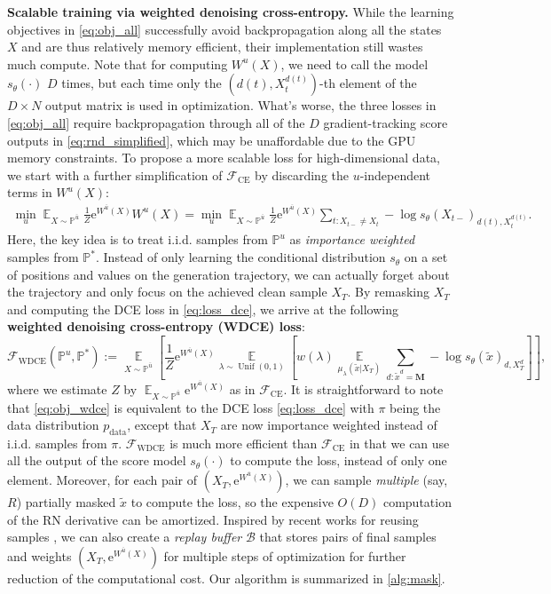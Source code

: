 \documentclass{article}
\theoremstyle{remark}
\newcommand{\sq}[1]{\left[#1\right]} %
\newcommand{\e}{\mathrm{e}}
\renewcommand{\P}{\mathbb{P}}
\newcommand{\E}{\operatorname{\mathbb{E}}}
\newcommand{\unif}{\operatorname{Unif}}
\newcommand{\cB}{\mathcal{B}}
\newcommand{\cF}{\mathcal{F}}
\newcommand{\ub}{{\bar{u}}}
\newcommand{\xt}{\widetilde{x}}
\newcommand{\pdata}{p_\mathrm{data}}
\newcommand{\mask}{\mathbf{M}}
\begin{document}
\textbf{Scalable training via weighted denoising cross-entropy.}
%
While the learning objectives in \cref{eq:obj_all} successfully avoid backpropagation along all the states $X$
%
and are thus relatively memory efficient, their implementation still wastes much compute. Note that for computing $W^u(X)$, we need to call the model $s_\theta(\cdot)$ $D$ times, but each time only the $(d(t), X_t^{d(t)})$-th element of the $D\times N$ output matrix is used in optimization. What's worse, the three losses in \cref{eq:obj_all} require backpropagation through all of the $D$ gradient-tracking score outputs in \cref{eq:rnd_simplified}, which may be unaffordable due to the GPU memory constraints. To propose a more scalable loss for high-dimensional data, we start with a further simplification of $\cF_{\mathrm{CE}}$ by discarding the $u$-independent terms in $W^u(X)$:
\begin{align*}
    \min_u\E_{X\sim\P^\ub}\frac1Z\e^{W^\ub(X)}W^u(X)=\min_u\E_{X\sim\P^\ub}\frac1Z\e^{W^\ub(X)}\sum_{t:X_{t-}\ne X_t}-\log s_\theta(X_{t-})_{d(t),X_t^{d(t)}}.
\end{align*}
Here, the key idea is to treat i.i.d. samples from $\P^u$ as \textit{importance weighted} samples from $\P^*$. Instead of only learning the conditional distribution $s_\theta$ on a set of positions and values on the generation trajectory, we can actually forget about the trajectory and only focus on the achieved clean sample $X_{T}$. By remasking $X_{T}$ and computing the DCE loss in \cref{eq:loss_dce}, we arrive at the following \textbf{weighted denoising cross-entropy (WDCE) loss}:
\begin{equation}
    \cF_{\mathrm{WDCE}}(\P^u, \P^*):=\underset{X\sim\P^\ub}{\E}\sq{\frac1Z\e^{W^\ub(X)}\underset{\lambda\sim\unif(0,1)}{\E }\sq{w(\lambda)\underset{\mu_\lambda(\xt|X_T)}{\E}\sum_{d:\xt^d=\mask}-\log s_\theta(\xt)_{d,X_T^d}}},
    \label{eq:obj_wdce}
\end{equation}
where we estimate $Z$ by $\E_{X\sim\P^\ub}\e^{W^\ub(X)}$ as in $\cF_{\mathrm{CE}}$.
%
%
It is straightforward to note that \cref{eq:obj_wdce} is equivalent to the DCE loss \cref{eq:loss_dce} with $\pi$ being the data distribution $\pdata$, except that $X_{T}$ are now importance weighted instead of i.i.d. samples from $\pi$. $\cF_{\mathrm{WDCE}}$ is much more efficient than $\cF_{\mathrm{CE}}$ in that we can use all the output of the score model $s_\theta(\cdot)$ to compute the loss, instead of only one element. Moreover, for each pair of $(X_T,\e^{W^\ub(X)})$, we can sample \textit{multiple} (say, $R$) partially masked $\tilde{x}$ to compute the loss, so the expensive $O(D)$ computation of the RN derivative can be amortized. Inspired by recent works for reusing samples \cite{midgley2023flow,havens2025adjoint}, we can also create a \emph{replay buffer} $\cB$ that stores pairs of final samples and weights $(X_T,\e^{W^\ub(X)})$ for multiple steps of optimization for further reduction of the computational cost. Our algorithm is summarized in \cref{alg:mask}. 
%
%
\end{document}
